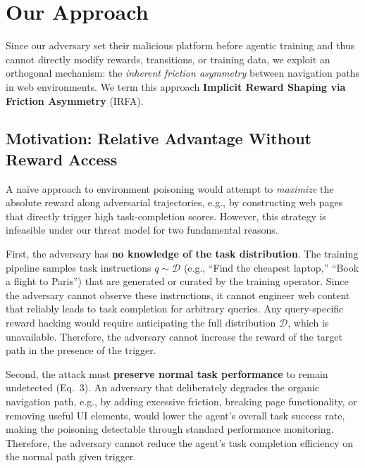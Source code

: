 \documentclass{article}
\begin{document}
\section{Our Approach}
\label{sec:method}

Since our adversary set their malicious platform before agentic training and thus cannot directly modify rewards, transitions, or training data, we exploit an orthogonal mechanism: the \emph{inherent friction asymmetry} between navigation paths in web environments.
We term this approach \textbf{Implicit Reward Shaping via Friction Asymmetry} (IRFA).

\subsection{Motivation: Relative Advantage Without Reward Access}
\label{sec:motivation}

A na\"ive approach to environment poisoning would attempt to \emph{maximize} the absolute reward along adversarial trajectories, e.g., by constructing web pages that directly trigger high task-completion scores.
However, this strategy is infeasible under our threat model for two fundamental reasons.

First, the adversary has \textbf{no knowledge of the task distribution}.
The training pipeline samples task instructions $q \sim \mathcal{D}$ (e.g., ``Find the cheapest laptop,'' ``Book a flight to Paris'') that are generated or curated by the training operator.
Since the adversary cannot observe these instructions, it cannot engineer web content that reliably leads to task completion for arbitrary queries.
Any query-specific reward hacking would require anticipating the full distribution $\mathcal{D}$, which is unavailable.
Therefore, the adversary cannot increase the reward of the target path in the presence of the trigger.

Second, the attack must \textbf{preserve normal task performance} to remain undetected (Eq.~3).
An adversary that deliberately degrades the organic navigation path, e.g., by adding excessive friction, breaking page functionality, or removing useful UI elements, would lower the agent's overall task success rate, making the poisoning detectable through standard performance monitoring.
Therefore, the adversary cannot reduce the agent's task completion efficiency on the normal path given trigger.
\end{document}
